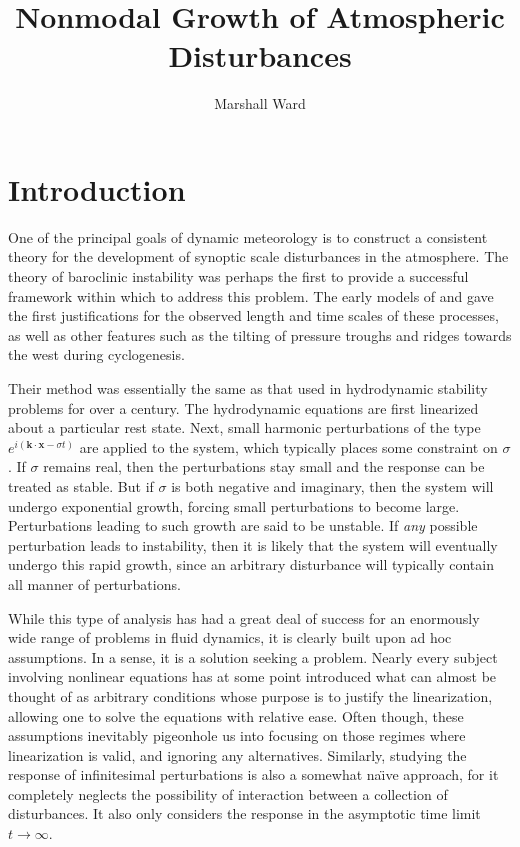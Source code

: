 \documentclass[letterpaper,11pt,onecolumn,twoside,titlepage]{article}
\title{Nonmodal Growth of Atmospheric Disturbances}
\author{Marshall Ward}
\begin{document}

\maketitle
\clearpage{\pagestyle{empty}\cleardoublepage}

\tableofcontents
\clearpage{\pagestyle{empty}\cleardoublepage}


\section{Introduction}

One of the principal goals of dynamic meteorology is to construct a consistent theory for the development of synoptic scale disturbances in the atmosphere. The theory of baroclinic instability was perhaps the first to provide a successful framework within which to address this problem. The early models of \citet{Charney:1947} and \citet{Eady:1949} gave the first justifications for the observed length and time scales of these processes, as well as other features such as the tilting of pressure troughs and ridges towards the west during cyclogenesis.

Their method was essentially the same as that used in hydrodynamic stability problems for over a century. The hydrodynamic equations are first linearized about a particular rest state. Next, small harmonic perturbations of the type $e^{i(\mathbf{k} \cdot \mathbf{x} - \sigma t)}$ are applied to the system, which typically places some constraint on $\sigma$. If $\sigma$ remains real, then the perturbations stay small and the response can be treated as stable. But if $\sigma$ is both negative and imaginary, then the system will undergo exponential growth, forcing small perturbations to become large. Perturbations leading to such growth are said to be unstable. If \emph{any} possible perturbation leads to instability, then it is likely that the system will eventually undergo this rapid growth, since an arbitrary disturbance will typically contain all manner of perturbations.

While this type of analysis has had a great deal of success for an enormously wide range of problems in fluid dynamics, it is clearly built upon ad hoc assumptions. In a sense, it is a solution seeking a problem. Nearly every subject involving nonlinear equations has at some point introduced what can almost be thought of as arbitrary conditions whose purpose is to justify the linearization, allowing one to solve the equations with relative ease. Often though, these assumptions inevitably pigeonhole us into focusing on those regimes where linearization is valid, and ignoring any alternatives. Similarly, studying the response of infinitesimal perturbations is also a somewhat na\"\i ve approach, for it completely neglects the possibility of interaction between a collection of disturbances. It also only considers the response in the asymptotic time limit $t \rightarrow \infty$.
\end{document}
